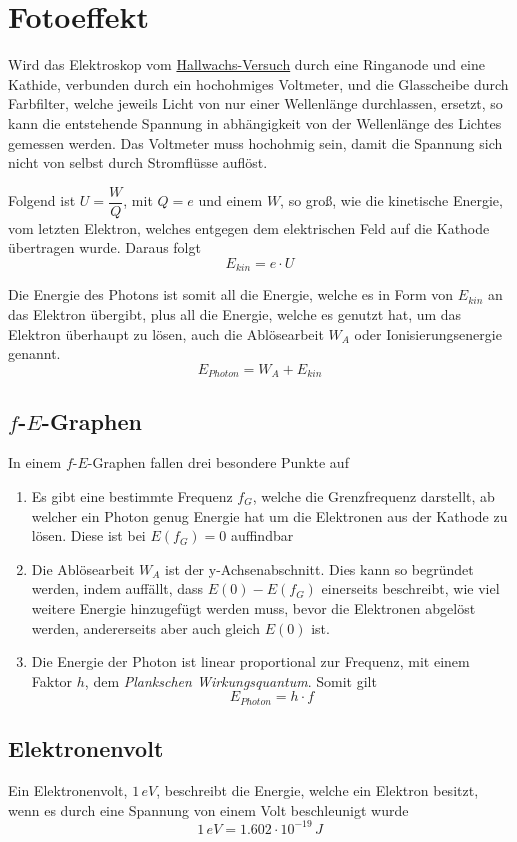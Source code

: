 \documentclass{article}
\begin{document}
\section{Fotoeffekt}
Wird das Elektroskop vom \hyperref[Der Hallswachs-Versuch]{Hallwachs-Versuch} durch eine Ringanode und eine Kathide, verbunden durch ein hochohmiges Voltmeter, und die Glasscheibe durch Farbfilter, welche jeweils Licht von nur einer Wellenlänge durchlassen, ersetzt, so kann die entstehende Spannung in abhängigkeit von der Wellenlänge des Lichtes gemessen werden. Das Voltmeter muss hochohmig sein, damit die Spannung sich nicht von selbst durch Stromflüsse auflöst.
 
Folgend ist $U = \dfrac{W}{Q}$, mit $Q=e$ und einem $W$, so groß, wie die kinetische Energie, vom letzten Elektron, welches entgegen dem elektrischen Feld auf die Kathode übertragen wurde. Daraus folgt
\[
 E_{kin} = e \cdot U
\] 
 
Die Energie des Photons ist somit all die Energie, welche es in Form von $E_{kin}$ an das Elektron übergibt, plus all die Energie, welche es genutzt hat, um das Elektron überhaupt zu lösen, auch die Ablösearbeit $W_A$ oder Ionisierungsenergie genannt.
\[
 E_{Photon} = W_A + E_{kin} 
\] 
 
\subsection{$f$-$E$-Graphen} 
In einem $f$-$E$-Graphen fallen drei besondere Punkte auf
\begin{enumerate}
 \item Es gibt eine bestimmte Frequenz $f_G$, welche die Grenzfrequenz darstellt, ab welcher ein Photon genug Energie hat um die Elektronen aus der Kathode zu lösen. Diese ist bei $E(f_G)=0$ auffindbar
 \item Die Ablösearbeit $W_A$ ist der y-Achsenabschnitt. Dies kann so begründet werden, indem auffällt, dass $E(0) - E(f_G)$ einerseits beschreibt, wie viel weitere Energie hinzugefügt werden muss, bevor die Elektronen abgelöst werden, andererseits aber auch gleich $E(0)$ ist.
 \item Die Energie der Photon ist linear proportional zur Frequenz, mit einem Faktor $h$, dem \emph{Plankschen Wirkungsquantum}. Somit gilt
\[
 E_{Photon} = h \cdot f 
\] 
\end{enumerate} 
 
\subsection{Elektronenvolt} 
Ein Elektronenvolt, $1 \, eV$, beschreibt die Energie, welche ein Elektron besitzt, wenn es durch eine Spannung von einem Volt beschleunigt wurde
\[
 1 \, eV = 1.602 \cdot 10^{-19} \, J 
\] 
\end{document}
